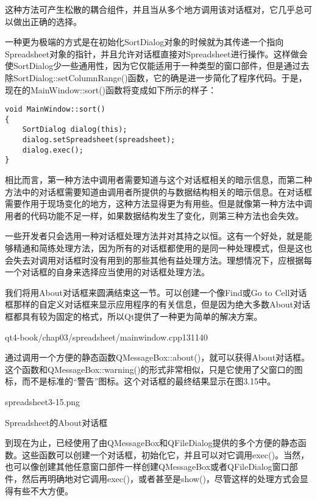 \documentclass[11pt,oneside]{book}
\begin{document}
\begin{common-format}
这种方法可产生松散的耦合组件，并且当从多个地方调用该对话框对，它几乎总可以做出正确的选择。

一种更为极端的方式是在初始化SortDialog对象的时候就为其传递一个指向Spreadsheet对象的指针，并且允许对话框直接对Spreadsheet进行操作。这样做会使SortDialog少一些通用性，因为它仅能适用于一种类型的窗口部件，但是通过去除SortDialog::setColumnRange()函数，它的确是进一步简化了程序代码。于是，现在的MainWindow::sort()函数将变成如下所示的样子：
\begin{Verbatim}
void MainWindow::sort()
{
    SortDialog dialog(this);
    dialog.setSpreadsheet(spreadsheet);
    dialog.exec();
}
\end{Verbatim}

相比而言，第一种方法中调用者需要知道与这个对话框相关的暗示信息，而第二种方法中的对话框需要知道由调用者所提供的与数据结构相关的暗示信息。在对话框需要作用于现场变化的地方，这种方法显得更为有用些。但是就像第一种方法中调用者的代码功能不足一样，如果数据结构发生了变化，则第三种方法也会失效。

一些开发者只会选用一种对话框处理方法并对其持之以恒。这有一个好处，就是能够精通和简练处理方法，因为所有的对话框都使用的是同一种处理模式，但是这也会失去对调用对话框时没有用到的那些其他有益处理方法。理想情况下，应根据每一个对话框的自身来选择应当使用的对话框处理方法。

我们将用About对话框来圆满结束这一节。可以创建一个像Find或Go to Cell对话框那样的自定义对话框来显示应用程序的有关信息，但是因为绝大多数About对话框都具有较为固定的格式，所以Qt提供了一种更为简单的解决方案。

\begin{cppline}{qt4-book/chap03/spreadsheet/mainwindow.cpp}{131}{140}
\end{cppline}

通过调用一个方便的静态函数QMessageBox::about()，就可以获得About对话框。这个函数和QMessageBox::warning()的形式非常相似，只是它使用了父窗口的图标，而不是标准的“警告”图标。这个对话框的最终结果显示在图3.15中。

\begin{linefig}[0.8]{spreadsheet3-15.png}
\caption{Spreadsheet的About对话框}
\label{fig:spreadsheet3-15.png}
\end{linefig}

到现在为止，已经使用了由QMessageBox和QFileDialog提供的多个方便的静态函数。这些函数可以创建一个对话框，初始化它，并且可以对它调用exec()。当然，也可以像创建其他任意窗口部件一样创建QMessageBox或者QFileDialog窗口部件，然后再明确地对它调用exec()，或者甚至是show()，尽管这样的处理方式会显得有些不大方便。


\end{common-format}
\end{document}
